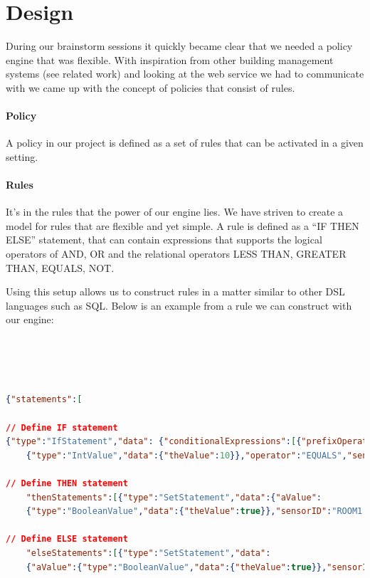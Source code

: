 \section{Design}
During our brainstorm sessions it quickly became clear that we needed a policy engine that was flexible. With inspiration from other building management systems (see related work) and looking at the web service we had to communicate with we came up with the concept of policies that consist of rules.

\paragraph{Policy}
A policy in our project is defined as a set of rules that can be activated in a given setting.

\paragraph{Rules}
It's in the rules that the power of our engine lies. We have striven to create a model for rules that are flexible and yet simple. A rule is defined as a "`IF THEN ELSE"' statement, that can contain expressions that supports the logical operators of AND, OR and the relational operators LESS THAN, GREATER THAN, EQUALS, NOT. 

Using this setup allows us to construct rules in a matter similar to other DSL languages such as SQL. Below is an example from a rule we can construct with our engine:
\\
\\
\\
\\
\\
\begin{lstlisting}[language=json,firstnumber=1]
{"statements":[

// Define IF statement
{"type":"IfStatement","data": {"conditionalExpressions":[{"prefixOperator":"AND","aValue":
	{"type":"IntValue","data":{"theValue":10}},"operator":"EQUALS","sensorId":"ROOM1.TEMPERATURE"}],

// Define THEN statement	
	"thenStatements":[{"type":"SetStatement","data":{"aValue":
	{"type":"BooleanValue","data":{"theValue":true}},"sensorID":"ROOM1.HEATER"}}],

// Define ELSE statement
	"elseStatements":[{"type":"SetStatement","data":
	{"aValue":{"type":"BooleanValue","data":{"theValue":true}},"sensorID":"ROOM1.BLINDS"}}]}}]}
\end{lstlisting}


